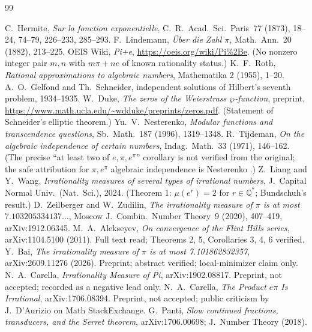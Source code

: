 \documentclass[11pt]{amsart}
\theoremstyle{definition}
\theoremstyle{remark}
\numberwithin{equation}{section}
\newcommand{\Q}{\mathbb{Q}}
\newcommand{\irr}{\mu}
\newcommand{\ee}{e}
\begin{document}
\begin{thebibliography}{99}

 C.~Hermite, \emph{Sur la fonction exponentielle}, C.~R.~Acad.~Sci.~Paris~77 (1873), 18--24, 74--79, 226--233, 285--293.
 F.~Lindemann, \emph{\"Uber die Zahl $\pi$}, Math.~Ann.~20 (1882), 213--225.
 OEIS Wiki, \emph{Pi+e}, \url{https://oeis.org/wiki/Pi\%2Be}. (No nonzero integer pair $m,n$ with $m\pi+n\ee$ of known rationality status.)
 K.~F.~Roth, \emph{Rational approximations to algebraic numbers}, Mathematika 2 (1955), 1--20.
 A.~O.~Gelfond and Th.~Schneider, independent solutions of Hilbert's seventh problem, 1934--1935.
 W.~Duke, \emph{The zeros of the Weierstrass $\wp$-function}, preprint, \url{https://www.math.ucla.edu/~wdduke/preprints/zeros.pdf}. (Statement of Schneider's elliptic theorem.)
 Yu.~V.~Nesterenko, \emph{Modular functions and transcendence questions}, Sb.~Math.~187 (1996), 1319--1348.
 R.~Tijdeman, \emph{On the algebraic independence of certain numbers}, Indag.~Math.~33 (1971), 146--162. (The precise ``at least two of $\ee,\pi,\ee^\pi$'' corollary is not verified from the original; the safe attribution for $\pi,\ee^\pi$ algebraic independence is Nesterenko \cite{Nesterenko1996}.)
 Z.~Liang and Y.~Wang, \emph{Irrationality measures of several types of irrational numbers}, J.~Capital Normal Univ.~(Nat.~Sci.), 2024. (Theorem 1: $\irr(\ee^r)=2$ for $r\in\Q^*$; Bundschuh's result.)
 D.~Zeilberger and W.~Zudilin, \emph{The irrationality measure of $\pi$ is at most $7.103205334137\dots$}, Moscow J.~Combin.~Number Theory~9 (2020), 407--419, arXiv:1912.06345.
 M.~A.~Alekseyev, \emph{On convergence of the Flint Hills series}, arXiv:1104.5100 (2011). Full text read; Theorems 2, 5, Corollaries 3, 4, 6 verified.
 Y.~Bai, \emph{The irrationality measure of $\pi$ is at most 7.101862832357}, arXiv:2609.11276 (2026). Preprint; abstract verified; local-minimizer claim only.
 N.~A.~Carella, \emph{Irrationality Measure of Pi}, arXiv:1902.08817. Preprint, not accepted; recorded as a negative lead only.
 N.~A.~Carella, \emph{The Product $e\pi$ Is Irrational}, arXiv:1706.08394. Preprint, not accepted; public criticism by J.~D'Aurizio on Math StackExchange.
 G.~Panti, \emph{Slow continued fractions, transducers, and the Serret theorem}, arXiv:1706.00698; J.~Number Theory (2018).

\end{thebibliography}
\end{document}
